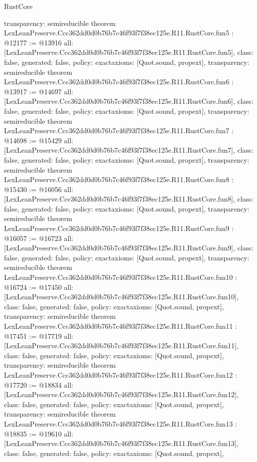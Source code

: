 \begin{lexlean}{RustCore}
\begin{coremodule}
{  transparency: semireducible
}
theorem LexLeanPreserve.Ccc362dd0d0b76b7c46f93f7f38ec125e.R11.RustCore.fun5 : @12177 := @13916 {
  all: [LexLeanPreserve.Ccc362dd0d0b76b7c46f93f7f38ec125e.R11.RustCore.fun5],
  class: false,
  generated: false,
  policy: exact{axioms: [Quot.sound, propext]},
  transparency: semireducible
}
theorem LexLeanPreserve.Ccc362dd0d0b76b7c46f93f7f38ec125e.R11.RustCore.fun6 : @13917 := @14697 {
  all: [LexLeanPreserve.Ccc362dd0d0b76b7c46f93f7f38ec125e.R11.RustCore.fun6],
  class: false,
  generated: false,
  policy: exact{axioms: [Quot.sound, propext]},
  transparency: semireducible
}
theorem LexLeanPreserve.Ccc362dd0d0b76b7c46f93f7f38ec125e.R11.RustCore.fun7 : @14698 := @15429 {
  all: [LexLeanPreserve.Ccc362dd0d0b76b7c46f93f7f38ec125e.R11.RustCore.fun7],
  class: false,
  generated: false,
  policy: exact{axioms: [Quot.sound, propext]},
  transparency: semireducible
}
theorem LexLeanPreserve.Ccc362dd0d0b76b7c46f93f7f38ec125e.R11.RustCore.fun8 : @15430 := @16056 {
  all: [LexLeanPreserve.Ccc362dd0d0b76b7c46f93f7f38ec125e.R11.RustCore.fun8],
  class: false,
  generated: false,
  policy: exact{axioms: [Quot.sound, propext]},
  transparency: semireducible
}
theorem LexLeanPreserve.Ccc362dd0d0b76b7c46f93f7f38ec125e.R11.RustCore.fun9 : @16057 := @16723 {
  all: [LexLeanPreserve.Ccc362dd0d0b76b7c46f93f7f38ec125e.R11.RustCore.fun9],
  class: false,
  generated: false,
  policy: exact{axioms: [Quot.sound, propext]},
  transparency: semireducible
}
theorem LexLeanPreserve.Ccc362dd0d0b76b7c46f93f7f38ec125e.R11.RustCore.fun10 : @16724 := @17450 {
  all: [LexLeanPreserve.Ccc362dd0d0b76b7c46f93f7f38ec125e.R11.RustCore.fun10],
  class: false,
  generated: false,
  policy: exact{axioms: [Quot.sound, propext]},
  transparency: semireducible
}
theorem LexLeanPreserve.Ccc362dd0d0b76b7c46f93f7f38ec125e.R11.RustCore.fun11 : @17451 := @17719 {
  all: [LexLeanPreserve.Ccc362dd0d0b76b7c46f93f7f38ec125e.R11.RustCore.fun11],
  class: false,
  generated: false,
  policy: exact{axioms: [Quot.sound, propext]},
  transparency: semireducible
}
theorem LexLeanPreserve.Ccc362dd0d0b76b7c46f93f7f38ec125e.R11.RustCore.fun12 : @17720 := @18834 {
  all: [LexLeanPreserve.Ccc362dd0d0b76b7c46f93f7f38ec125e.R11.RustCore.fun12],
  class: false,
  generated: false,
  policy: exact{axioms: [Quot.sound, propext]},
  transparency: semireducible
}
theorem LexLeanPreserve.Ccc362dd0d0b76b7c46f93f7f38ec125e.R11.RustCore.fun13 : @18835 := @19610 {
  all: [LexLeanPreserve.Ccc362dd0d0b76b7c46f93f7f38ec125e.R11.RustCore.fun13],
  class: false,
  generated: false,
  policy: exact{axioms: [Quot.sound, propext]},
}
\end{coremodule}
\end{lexlean}
